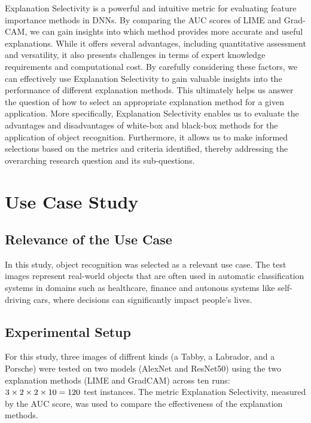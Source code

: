 \documentclass{article}
\begin{document}
Explanation Selectivity is a powerful and intuitive metric for evaluating feature importance methods in DNNs. By comparing the AUC scores of LIME and Grad-CAM, we can gain insights into which method provides more accurate and useful explanations. While it offers several advantages, including quantitative assessment and versatility, it also presents challenges in terms of expert knowledge requirements and computational cost. By carefully considering these factors, we can effectively use Explanation Selectivity to gain valuable insights into the performance of different explanation methods. This ultimately helps us answer the question of how to select an appropriate explanation method for a given application. More specifically, Explanation Selectivity enables us to evaluate the advantages and disadvantages of white-box and black-box methods for the application of object recognition. Furthermore, it allows us to make informed selections based on the metrics and criteria identified, thereby addressing the overarching research question and its sub-questions.

\section{Use Case Study}
\subsection{Relevance of the Use Case}
In this study, object recognition was selected as a relevant use case. The test images represent real-world objects that are often used in automatic classification systems in domains such as healthcare, finance and autonous systems like self-driving cars, where decisions can significantly impact people's lives.

\subsection{Experimental Setup}
For this study, three images of diffrent kinds (a Tabby, a Labrador, and a Porsche) were tested on two models (AlexNet and ResNet50) using the two explanation methods (LIME and GradCAM) across ten runs: $ 3 \times 2 \times 2 \times 10 = 120 \space $  test instances.
The metric Explanation Selectivity, measured by the AUC score, was used to compare the effectiveness of the explanation methods. 
\end{document}
